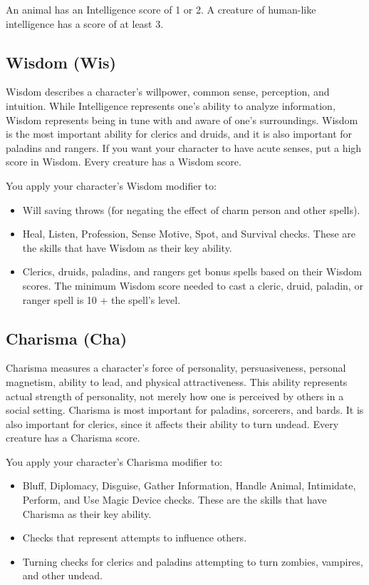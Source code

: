 An animal has an Intelligence score of 1 or 2. A creature of human-like intelligence has a score of at least 3.

\subsection{Wisdom (Wis)}
Wisdom describes a character's willpower, common sense, perception, and intuition. While Intelligence represents one's ability to analyze information, Wisdom represents being in tune with and aware of one's surroundings. Wisdom is the most important ability for clerics and druids, and it is also important for paladins and rangers. If you want your character to have acute senses, put a high score in Wisdom. Every creature has a Wisdom score.

You apply your character's Wisdom modifier to:

\begin{itemize}
\item Will saving throws (for negating the effect of charm person and other spells).
\item Heal, Listen, Profession, Sense Motive, Spot, and Survival checks. These are the skills that have Wisdom as their key ability.
\item Clerics, druids, paladins, and rangers get bonus spells based on their Wisdom scores. The minimum Wisdom score needed to cast a cleric, druid, paladin, or ranger spell is 10 + the spell's level.
\end{itemize}

\subsection{Charisma (Cha)}
Charisma measures a character's force of personality, persuasiveness, personal magnetism, ability to lead, and physical attractiveness. This ability represents actual strength of personality, not merely how one is perceived by others in a social setting. Charisma is most important for paladins, sorcerers, and bards. It is also important for clerics, since it affects their ability to turn undead. Every creature has a Charisma score.

You apply your character's Charisma modifier to:

\begin{itemize}
\item Bluff, Diplomacy, Disguise, Gather Information, Handle Animal, Intimidate, Perform, and Use Magic Device checks. These are the skills that have Charisma as their key ability.
\item Checks that represent attempts to influence others.
\item Turning checks for clerics and paladins attempting to turn zombies, vampires, and other undead.
\end{itemize}

